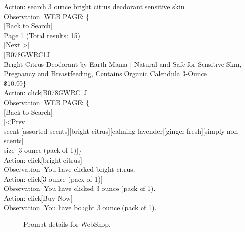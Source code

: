 \begin{tcolorbox}[breakable,title=Prompt Details for WebShop ]
\textnormal{Action: search[3 ounce bright citrus deodorant sensitive skin]}\\
\textnormal{Observation: WEB PAGE: \{}\\
\textnormal{[Back to Search]}\\
\textnormal{Page 1 (Total results: 15)}\\
\textnormal{[Next \textgreater]}\\
\textnormal{[B078GWRC1J]}\\
\textnormal{Bright Citrus Deodorant by Earth Mama | Natural and Safe for Sensitive Skin, Pregnancy and Breastfeeding, Contains Organic Calendula 3-Ounce}\\ \textnormal{\$10.99\}}\\

\textnormal{Action: click[B078GWRC1J]}\\
\textnormal{Observation: WEB PAGE: \{}\\
\textnormal{[Back to Search]}\\ 
\textnormal{[\textless Prev]}\\ 
\textnormal{scent [assorted scents][bright citrus][calming lavender][ginger fresh][simply non-scents]}\\
\textnormal{size [3 ounce (pack of 1)]\}}\\

\textnormal{Action: click[bright citrus]}\\
\textnormal{Observation: You have clicked bright citrus.} \\

\textnormal{Action: click[3 ounce (pack of 1)]}\\
\textnormal{Observation: You have clicked 3 ounce (pack of 1).} \\

\textnormal{Action: click[Buy Now]}\\
\textnormal{Observation: You have bought 3 ounce (pack of 1).}



\end{tcolorbox}
\begin{figure}[!h]
    \vspace{0.01cm}
    \caption{Prompt details for WebShop.}
    \label{fig:webshop_prompt}
\end{figure}
